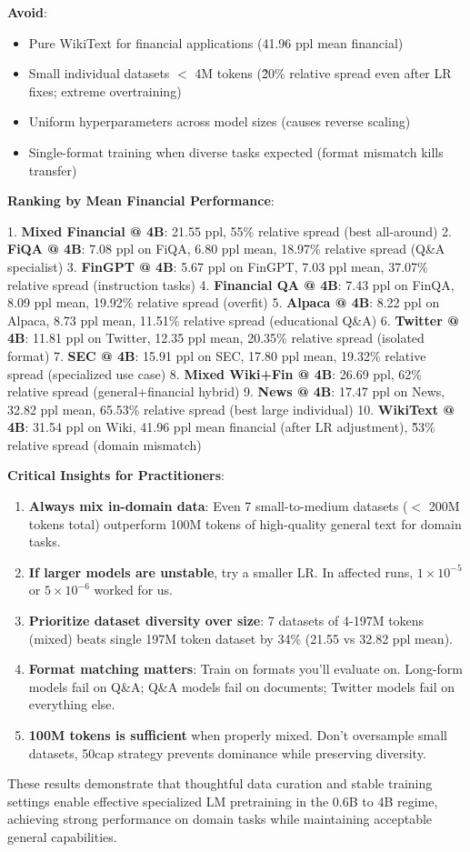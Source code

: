 \textbf{Avoid}:
\begin{itemize}
\item Pure WikiText for financial applications (41.96 ppl mean financial)
\item Small individual datasets $<$ 4M tokens (\~20\% relative spread even after LR fixes; extreme overtraining)
\item Uniform hyperparameters across model sizes (causes reverse scaling)
\item Single-format training when diverse tasks expected (format mismatch kills transfer)
\end{itemize}

\textbf{Ranking by Mean Financial Performance}:

1. \textbf{Mixed Financial @ 4B}: 21.55 ppl, 55\% relative spread (best all-around)
2. \textbf{FiQA @ 4B}: 7.08 ppl on FiQA, 6.80 ppl mean, 18.97\% relative spread (Q\&A specialist)
3. \textbf{FinGPT @ 4B}: 5.67 ppl on FinGPT, 7.03 ppl mean, 37.07\% relative spread (instruction tasks)
4. \textbf{Financial QA @ 4B}: 7.43 ppl on FinQA, 8.09 ppl mean, 19.92\% relative spread (overfit)
5. \textbf{Alpaca @ 4B}: 8.22 ppl on Alpaca, 8.73 ppl mean, 11.51\% relative spread (educational Q\&A)
6. \textbf{Twitter @ 4B}: 11.81 ppl on Twitter, 12.35 ppl mean, 20.35\% relative spread (isolated format)
7. \textbf{SEC @ 4B}: 15.91 ppl on SEC, 17.80 ppl mean, 19.32\% relative spread (specialized use case)
8. \textbf{Mixed Wiki+Fin @ 4B}: 26.69 ppl, 62\% relative spread (general+financial hybrid)
9. \textbf{News @ 4B}: 17.47 ppl on News, 32.82 ppl mean, 65.53\% relative spread (best large individual)
10. \textbf{WikiText @ 4B}: 31.54 ppl on Wiki, 41.96 ppl mean financial (after LR adjustment), \~53\% relative spread (domain mismatch)

\textbf{Critical Insights for Practitioners}:

\begin{enumerate}
\item \textbf{Always mix in-domain data}: Even 7 small-to-medium datasets ($<$ 200M tokens total) outperform 100M tokens of high-quality general text for domain tasks.
\item \textbf{If larger models are unstable}, try a smaller LR. In affected runs, $1\times10^{-5}$ or $5\times10^{-6}$ worked for us.
\item \textbf{Prioritize dataset diversity over size}: 7 datasets of 4-197M tokens (mixed) beats single 197M token dataset by 34\% (21.55 vs 32.82 ppl mean).
\item \textbf{Format matching matters}: Train on formats you'll evaluate on. Long-form models fail on Q\&A; Q\&A models fail on documents; Twitter models fail on everything else.
\item \textbf{100M tokens is sufficient} when properly mixed. Don't oversample small datasets, 50cap strategy prevents dominance while preserving diversity.
\end{enumerate}

These results demonstrate that thoughtful data curation and stable training settings enable effective specialized LM pretraining in the 0.6B to 4B regime, achieving strong performance on domain tasks while maintaining acceptable general capabilities.
